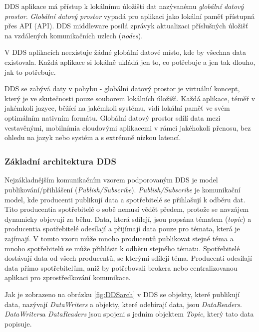 \acs{DDS} aplikace má přístup k lokálnímu úložišti dat nazývanému \textit{globální datový prostor}. \textit{Globální datový prostor} vypadá pro aplikaci jako lokální paměť přístupná přes \acs{API} (\acl{API}). \acs{DDS} middleware posílá zprávy\break k aktualizaci příslušných úložišť na vzdálených komunikačních uzlech (\textit{nodes}).

V \acs{DDS} aplikacích neexistuje žádné globální datové místo, kde by všechna data existovala. Každá aplikace si lokálně ukládá jen to, co potřebuje a jen tak dlouho, jak to potřebuje. \cite{DDS_Main}

\acs{DDS} se zabývá daty v pohybu - globální datový prostor je virtuální koncept, který je ve skutečnosti pouze souborem lokálních úložišť. Každá aplikace, téměř v jakémkoli jazyce, běžící na jakémkoli systému, vidí lokální paměť ve svém optimálním nativním formátu. Globální datový prostor sdílí data mezi vestavěnými, mobilními\break a cloudovými aplikacemi v rámci jakéhokoli přenosu, bez ohledu na jazyk nebo systém a s extrémně nízkou latencí.

\subsubsection{Základní architektura DDS\texorpdfstring{\textsuperscript{\textregistered}}{ (R)}}

Nejzákladnějším komunikačním vzorem podporovaným \acs{DDS} je model publikování/přihlášení (\textit{Publish/Subscribe}). \textit{Publish/Subscribe} je komunikační model, kde producenti publikují data a spotřebitelé se přihlašují k odběru dat. Tito producenti\break a spotřebitelé o sobě nemusí vědět předem, protože se navzájem dynamicky objevují za běhu. Data, která sdílejí, jsou popsána tématem (\textit{topic}) a producenti\break a spotřebitelé odesílají a přijímají data pouze pro témata, která je zajímají. V tomto vzoru může mnoho producentů publikovat stejné téma a mnoho spotřebitelů se může přihlásit k odběru stejného tématu. Spotřebitelé dostávají data od všech producentů, se kterými sdílejí téma. Producenti odesílají data přímo spotřebitelům, aniž by potřebovali brokera nebo centralizovanou aplikaci pro zprostředkování komunikace. \cite{DDS_PubSub}

Jak je zobrazeno na obrázku \ref{fig:DDSarch} v \acs{DDS} se objekty, které publikují data, nazývají \textit{DataWriters} a objekty, které odebírají data, jsou \textit{DataReaders}. \textit{DataWriters}\break a \textit{DataReaders} jsou spojeni s jedním objektem \textit{Topic}, který tato data popisuje.

